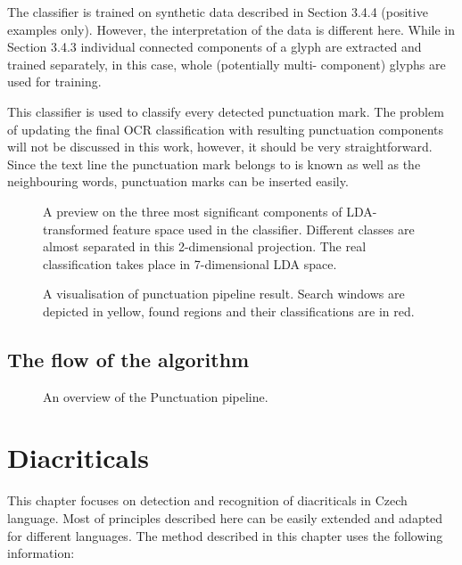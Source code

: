 \documentclass[12pt,a4paper]{report}
\begin{document}
The classifier is trained on synthetic data described in Section 3.4.4 (positive examples only). However, the interpretation of the data is different here. While in Section 3.4.3 individual connected components of a glyph are extracted and trained separately, in this case, whole (potentially multi- component) glyphs are used for training.

This classifier is used to classify every detected punctuation mark. The problem of updating the final OCR classification with resulting punctuation components will not be discussed in this work, however, it should be very straightforward. Since the text line the punctuation mark belongs to is known as well as the neighbouring words, punctuation marks can be inserted easily.

\begin{figure}[htbp]
    \centering
    \caption{A preview on the three most significant components of LDA-transformed feature space used in the classifier. Different classes are almost separated in this 2-dimensional projection. The real classification takes place in 7-dimensional LDA space.}
    \label{fig:lda-space}
\end{figure}

\begin{figure}[htbp]
    \centering
    \caption{A visualisation of punctuation pipeline result. Search windows are depicted in yellow, found regions and their classifications are in red.}
    \label{fig:punctuation-result}
\end{figure}

\section{The flow of the algorithm}
\begin{figure}[htbp]
    \centering
    \caption{An overview of the Punctuation pipeline.}
    \label{fig:punctuation-flow}
\end{figure}

\chapter{Diacriticals}
This chapter focuses on detection and recognition of diacriticals in Czech language. Most of principles described here can be easily extended and adapted for different languages. The method described in this chapter uses the following information:
\end{document}

